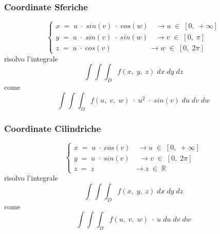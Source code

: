 \documentclass[a4paper, 10pt]{article}
\begin{document}
  				\subsubsection{Coordinate Sferiche}
  					 \[
	  					 \begin{cases}
		  					 x\; =\; u\; \cdot\; sin(v)\; \cdot\; cos(w)\quad \rightarrow u\; \in\; [0,\; +\infty] \\
		  					 y\; =\; u\; \cdot\; sin(v)\; \cdot\; sin(w)\quad \rightarrow v\; \in\; [0,\; \pi] \\ 
		  					 z\; =\; u\; \cdot\; cos(v)\quad\quad\quad\quad\quad\; \rightarrow w\; \in\; [0,\; 2\pi]
	  					 \end{cases} 
  					 \]			 
  					 risolvo l'integrale
	  					 \[
	  					 	\int{\int{\int_{D}^{}{f(x,\; y,\; z)\; dx\; dy\; dz}}}
	  					 \]come
	  					 \[
	  					 	\int{\int{\int_{\Omega}^{}{f(u,\; v,\; w)\; \cdot\; u^2\; \cdot\; sin(v)\; du\; dv\; dw}}}	
	  					 \]
  					 
  				\subsubsection{Coordinate Cilindriche}  		
  					\[ 
		  					\begin{cases}
			  					x\; =\; u\; \cdot\; cos(v)\quad \rightarrow u\; \in\; [0,\; +\infty] \\
			  					y\; =\; u\; \cdot\; sin(v)\;\quad \rightarrow v\; \in\; [0,\; 2\pi] \\ 
			  					z\; =\; z\;\quad\quad\quad\quad\quad\; \rightarrow z\; \in\; \mathbb{R}
		  					\end{cases} 
  					\]
  					risolvo l'integrale
	  					\[
	  						\int{\int{\int_{D}^{}{f(x,\; y,\; z)\; dx\; dy\; dz}}}
	  					\]come
	  					\[
	  						\int{\int{\int_{\Omega}^{}{f(u,\; v,\; w)\; \cdot\; u\; du\; dv\; dw}}}	
	  					\] 					
 					
\end{document}
